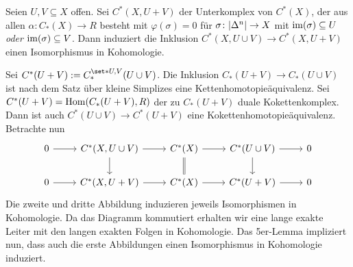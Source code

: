 \begin{lemma}[{name=[{Isomorphismus in Kohomologie von relativen Kokettenkomplexen}]}]
	Seien $U,V \subseteq X$ offen. 
	Sei $C^*(X,U+V)$ der Unterkomplex von $C^*(X)$, der aus allen $\alpha \colon C_*(X)\to R$ besteht mit $\varphi(\sigma)=0$ für $\sigma \colon \abs*{\Delta^n}\to X$ mit $\operatorname{im} (\sigma) \subseteq U$ \emph{oder} $\operatorname{im} (\sigma) \subseteq V$. 
	Dann induziert die Inklusion $C^*(X, U\cup V) \to C^*(X,U+V)$ einen Isomorphismus in Kohomologie.
\end{lemma}
\begin{beweis}
	Sei $C^*(U+V) := C_*^{\set*{U,V}}(U \cup V)$. 
	Die Inklusion $C_*(U +V)\to C_*(U \cup V)$ ist nach dem Satz über kleine Simplizes eine Kettenhomotopieäquivalenz.
	Sei $C^*(U+V)= \Hom \enbrace*{C_*(U+V),R}$ der zu $C_*(U+V)$ duale Kokettenkomplex. 
	Dann ist auch $C^*(U \cup V) \to C^*(U+V)$ eine Kokettenhomotopieäquivalenz.
	Betrachte nun
	\[
		\begin{tikzcd}
			0 \rar & C^*(X,U\cup V) \dar  \rar & C^*(X)\dar[equal] \rar & C^*(U \cup V) \dar \rar & 0 \\
			0 \rar & C^*(X,U+V) \rar & C^*(X) \rar & C^*(U+V) \rar & 0
		\end{tikzcd}
	\]
	Die zweite und dritte Abbildung induzieren jeweils Isomorphismen in Kohomologie. 
	Da das Diagramm kommutiert erhalten wir eine lange exakte Leiter mit den langen exakten Folgen in Kohomologie.
	Das 5er-Lemma impliziert nun, dass auch die erste Abbildungen einen Isomorphismus in Kohomologie induziert.
\end{beweis}

